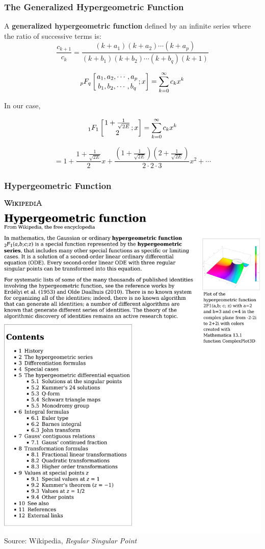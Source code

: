 \documentclass{beamer}
\begin{document}
\begin{frame}
\frametitle{The Generalized Hypergeometric Function}
A {\bf generalized hypergeometric function} defined by an infinite series where
the ratio of successive terms is:
\[ \frac{c_{k+1}}{c_k} = \frac{(k+a_1)(k+a_2)\cdots(k+a_p)}{(k+b_1)(k+b_2)\cdots(k+b_q)(k+1)} \]

\[ {}_p F_q\left[\genfrac{}{}{0pt}{0}{a_1,a_2,\cdots,a_p}{b_1,b_2,\cdots,b_q};x\right] = \sum_{k=0}^{\infty} c_k x^k \]

In our case,

\[ {}_1 F_1\left[\genfrac{}{}{0pt}{0}{1+\frac{1}{\sqrt{2E}}}{2};x\right] = \sum_{k=0}^{\infty} c_k x^k \]

\[ = 1 + \frac{1+\frac{1}{\sqrt{2E}}}{2}x + \frac{\left(1+\frac{1}{\sqrt{2E}}\right)\left(2+\frac{1}{\sqrt{2E}}\right)}{2\cdot 2\cdot 3}x^2 + \cdots \]

\end{frame}

\begin{frame}
\frametitle{Hypergeometric Function}
\includegraphics[page=1, clip, trim=0in 0in 0in 0in, width=\textwidth]{Hypergeometric Function - Wikipedia.pdf}
Source: Wikipedia, {\it Regular Singular Point}
\end{frame}
\end{document}
